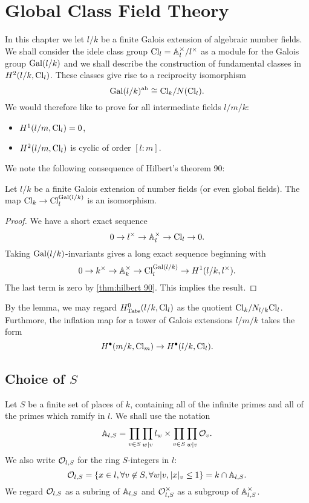\chapter{Global Class Field Theory}

In this chapter we let $l/k$ be a finite Galois extension of
algebraic number fields. We shall consider the idele class group $\mathrm{Cl}_l = {\mathbb A}_l^\times / l^\times$
as a module for the Galois group $\mathrm{Gal}(l/k)$ and we shall describe the construction of
fundamental classes in $H^2(l/k, \mathrm{Cl}_l)$.
These classes give rise to a reciprocity isomorphism
\[
	\mathrm{Gal}(l/k)^{\mathrm{ab}} \cong \mathrm{Cl}_k / N(\mathrm{Cl}_l).
\]
We would therefore like to prove for all intermediate fields $l / m / k$:
\begin{itemize}
	\item
	$H^1(l/m, \mathrm{Cl}_l) = 0$,
	\item
	$H^2(l/m, \mathrm{Cl}_l)$ is cyclic of order $[l:m]$.
\end{itemize}

We note the following consequence of Hilbert's theorem 90:

\begin{lemma} \label{lem:idele class invariants}
	Let $l/k$ be a finite Galois extension of number fields (or even global fields).
	The map $\mathrm{Cl}_k \to \mathrm{Cl}_l ^ {\mathrm{Gal}(l/k)}$ is an isomorphism.
\end{lemma}

\begin{proof}
	We have a short exact sequence
	\[
		0 \to l^\times \to {\mathbb A}_l^\times \to \mathrm{Cl}_l \to 0.
	\]
	Taking $\mathrm{Gal}(l/k)$-invariants gives a long exact sequence beginning with
	\[
		0 \to k^\times \to {\mathbb A}_k^\times \to \mathrm{Cl}_l^{\mathrm{Gal}(l/k)} \to H^1(l/k, l^\times).
	\]
	The last term is zero by \ref{thm:hilbert 90}. This implies the result.
\end{proof}

By the lemma, we may regard $H^0_{\mathrm{Tate}}(l/k,\mathrm{Cl}_l)$ as the quotient
$\mathrm{Cl}_k / N_{l/k} \mathrm{Cl}_l$.
Furthmore, the inflation map for a tower of Galois extensions $l/m/k$ takes the form
\[
	H^\bullet(m/k, \mathrm{Cl}_m) \to H^\bullet(l/k, \mathrm{Cl}_l).
\]







\section{Choice of $S$}

Let $S$ be a finite set of places of $k$, containing all of the infinite primes and all
of the primes which ramify in $l$.
We shall use the notation
\[
	{\mathbb A}_{l,S} = \prod_{v \in S} \prod_{w | v} l_w \times \prod_{v \in S} \prod_{w | v} {\mathcal O}_v.
\]
We also write ${\mathcal O}_{l,S}$ for the ring $S$-integers in $l$:
\[
	{\mathcal O}_{l,S} = \{x \in l, \forall v \not\in S, \forall w | v, |x|_v \le 1\} = k \cap {\mathbb A}_{l,S}.
\]
We regard ${\mathcal O}_{l,S}$ as a subring of ${\mathbb A}_{l,S}$ and
${\mathcal O}_{l,S}^\times$ as a subgroup of ${\mathbb A}_{l,S}^\times$.

